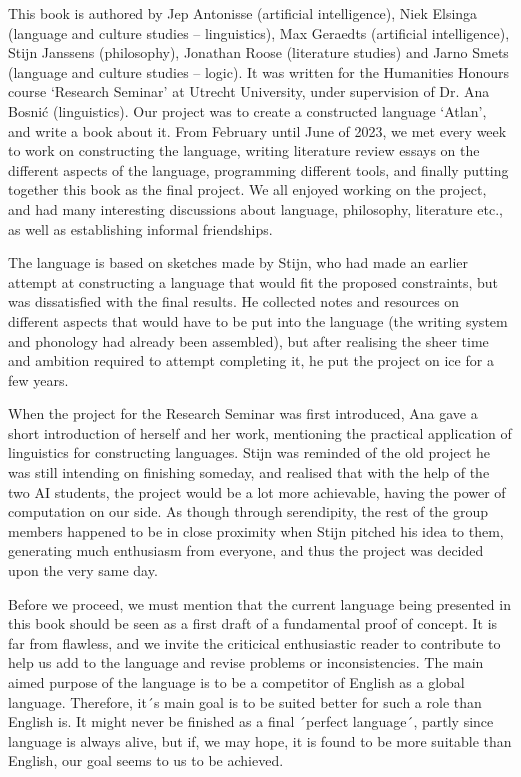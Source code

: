 This book is authored by Jep Antonisse (artificial intelligence), Niek Elsinga (language and culture studies – linguistics), Max Geraedts (artificial intelligence), Stijn Janssens (philosophy), Jonathan Roose (literature studies) and Jarno Smets (language and culture studies – logic). It was written for the Humanities Honours course ‘Research Seminar’ at Utrecht University, under supervision of Dr. Ana Bosnić (linguistics). Our project was to create a constructed language ‘Atlan’, and write a book about it. From February until June of 2023, we met every week to work on constructing the language, writing literature review essays on the different aspects of the language, programming different tools, and finally putting together this book as the final project. We all enjoyed working on the project, and had many interesting discussions about language, philosophy, literature etc., as well as establishing informal friendships. 

The language is based on sketches made by Stijn, who had made an earlier attempt at constructing a language that would fit the proposed constraints, but was dissatisfied with the final results. He collected notes and resources on different aspects that would have to be put into the language (the writing system and phonology had already been assembled), but after realising the sheer time and ambition required to attempt completing it, he put the project on ice for a few years.  

When the project for the Research Seminar was first introduced, Ana gave a short introduction of herself and her work, mentioning the practical application of linguistics for constructing languages. Stijn was reminded of the old project he was still intending on finishing someday, and realised that with the help of the two AI students, the project would be a lot more achievable, having the power of computation on our side. As though through serendipity, the rest of the group members happened to be in close proximity when Stijn pitched his idea to them, generating much enthusiasm from everyone, and thus the project was decided upon the very same day.  

Before
we proceed, we must mention that the current language being presented in this
book should be seen as a first draft of a fundamental proof of concept. It is
far from flawless, and we invite the criticical enthusiastic reader to
contribute to help us add to the language and revise problems or
inconsistencies. The main aimed purpose of the language is to be a competitor
of English as a global language. Therefore, it´s main goal is to be suited
better for such a role than English is. It might never be finished as a final ´perfect
language´, partly since language is always alive, but if, we may hope, it is
found  to be more suitable than English, our goal seems to us to be achieved.

